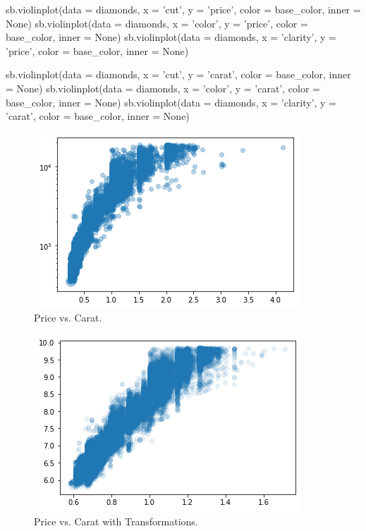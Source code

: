 \begin{python}
	sb.violinplot(data = diamonds, x = 'cut', y = 'price', color = base_color, inner = None)
	sb.violinplot(data = diamonds, x = 'color', y = 'price', color = base_color, inner = None)
	sb.violinplot(data = diamonds, x = 'clarity', y = 'price', color = base_color, inner = None)
	
	sb.violinplot(data = diamonds, x = 'cut', y = 'carat', color = base_color, inner = None)
	sb.violinplot(data = diamonds, x = 'color', y = 'carat', color = base_color, inner = None)
	sb.violinplot(data = diamonds, x = 'clarity', y = 'carat', color = base_color, inner = None)
\end{python}

\begin{figure}
	\includegraphics{images/figure51.png}
	\caption{Price vs. Carat.}\label{fig:figure51}
\end{figure}

\begin{figure}
	\includegraphics{images/figure52.png}
	\caption{Price vs. Carat with Transformations.}\label{fig:figure52}
\end{figure}